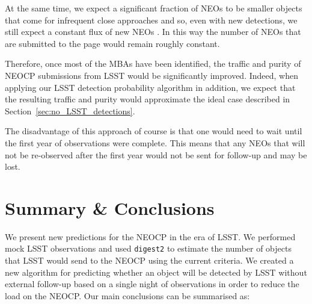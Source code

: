 \documentclass[twocolumn]{aastex631}
\newcommand{\dig}{\texttt{digest2}}
\begin{document}
At the same time, we expect a significant fraction of NEOs to be smaller objects that come for infrequent close approaches and so, even with new detections, we still expect a constant flux of new NEOs \citep{Juric+2020}. In this way the number of NEOs that are submitted to the page would remain roughly constant.

Therefore, once most of the MBAs have been identified, the traffic and purity of NEOCP submissions from LSST would be significantly improved. Indeed, when applying our LSST detection probability algorithm in addition, we expect that the resulting traffic and purity would approximate the ideal case described in Section~\ref{sec:no_LSST_detections}.

The disadvantage of this approach of course is that one would need to wait until the first year of observations were complete. This means that any NEOs that will not be re-observed after the first year would not be sent for follow-up and may be lost.

\section{Summary \& Conclusions} \label{sec:conclusion}
We present new predictions for the NEOCP in the era of LSST. We performed mock LSST observations and used \dig{} to estimate the number of objects that LSST would send to the NEOCP using the current criteria. We created a new algorithm for predicting whether an object will be detected by LSST without external follow-up based on a single night of observations in order to reduce the load on the NEOCP. Our main conclusions can be summarised as:
\end{document}
